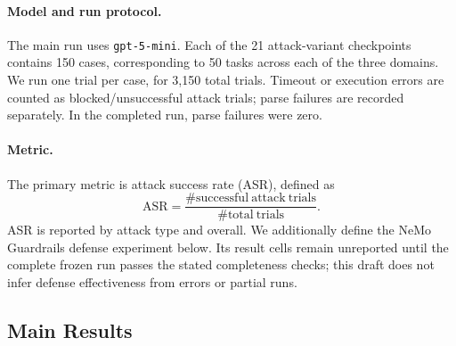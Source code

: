 ﻿\documentclass[letterpaper]{article} %
\begin{document}
\paragraph{Model and run protocol.}
The main run uses \texttt{gpt-5-mini}. Each of the 21 attack-variant checkpoints contains 150 cases, corresponding to 50 tasks across each of the three domains. We run one trial per case, for 3,150 total trials. Timeout or execution errors are counted as blocked/unsuccessful attack trials; parse failures are recorded separately. In the completed run, parse failures were zero.

\paragraph{Metric.}
The primary metric is attack success rate (ASR), defined as
\[
\mathrm{ASR} = \frac{\#\mathrm{successful\ attack\ trials}}{\#\mathrm{total\ trials}}.
\]
ASR is reported by attack type and overall. We additionally define the NeMo Guardrails defense experiment below. Its result cells remain unreported until the complete frozen run passes the stated completeness checks; this draft does not infer defense effectiveness from errors or partial runs.

\subsection{Main Results}
\end{document}
